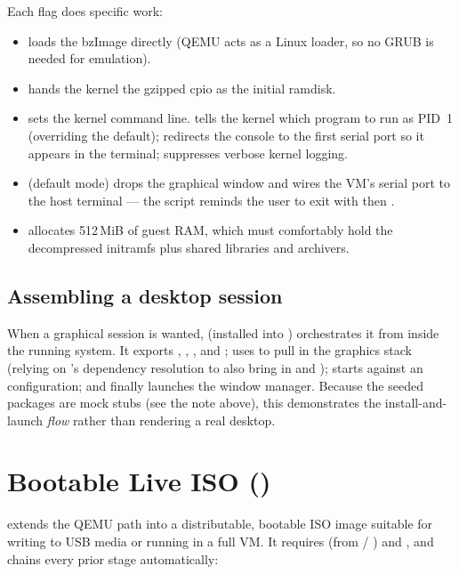 Each flag does specific work:

\begin{itemize}
  \item {} loads the bzImage directly (QEMU acts as a Linux
        loader, so no GRUB is needed for emulation).
  \item {} hands the kernel the gzipped cpio as the initial
        ramdisk.
  \item {} sets the kernel command line. 
        tells the kernel which program to run as PID~1 (overriding the
         default);  redirects the console to
        the first serial port so it appears in the terminal; 
        suppresses verbose kernel logging.
  \item {} (default mode) drops the graphical window and wires
        the VM's serial port to the host terminal --- the script reminds the
        user to exit with  then .
  \item {} allocates 512\,MiB of guest RAM, which must comfortably
        hold the decompressed initramfs plus shared libraries and archivers.
\end{itemize}

\subsection{Assembling a desktop session}

When a graphical session is wanted,  (installed into
) orchestrates it from inside the running system. It exports
, , , and ; uses
 to pull in the graphics stack
(relying on 's dependency resolution to also bring in
 and ); starts  against an
 configuration; and finally launches the  window
manager. Because the seeded packages are mock stubs (see the note above), this
demonstrates the install-and-launch \emph{flow} rather than rendering a real
desktop.

\section{Bootable Live ISO ()}

 extends the QEMU path into a distributable, bootable ISO
image suitable for writing to USB media or running in a full VM. It requires
 (from  / ) and
, and chains every prior stage automatically:

